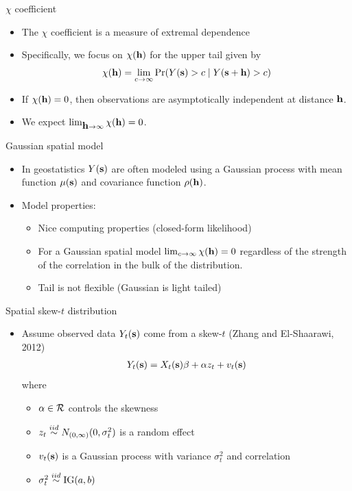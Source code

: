 \documentclass{beamer}
\begin{document}
\begin{frame}{$\chi$ coefficient}
  \begin{itemize} \setlength{\itemsep}{0.5em}
   \item The $\chi$ coefficient is a measure of extremal dependence
   \item Specifically, we focus on $\chi(\mbox{\bf h})$ for the upper tail given by
    \begin{align*}
      \chi(\mbox{\bf h}) = \lim_{c \rightarrow \infty}\Pr(Y(\mbox{\bf s}) > c \mid Y(\mbox{\bf s} + \mbox{\bf h}) > c)
    \end{align*}
    \item If $ \chi(\mbox{\bf h}) = 0$, then observations are asymptotically independent at distance $\mbox{\bf h}$.
    \item We expect $\lim_{\mbox{\bf h} \rightarrow \infty}\chi(\mbox{\bf h})=0$.
  \end{itemize}
\end{frame}

\begin{frame}{Gaussian spatial model}
  \begin{itemize} \setlength{\itemsep}{0.5em}
    \item In geostatistics $Y(\mbox{\bf s})$ are often modeled using a Gaussian process with mean function $\mu(\mbox{\bf s})$ and covariance function
$\rho(\mbox{\bf h})$.
    \item Model properties:
    \begin{itemize}
      \item Nice computing properties (closed-form likelihood)
    \item For a Gaussian spatial model $\lim_{c \rightarrow \infty} \chi(\mbox{\bf h}) = 0$ regardless of the strength of the correlation in the bulk of the distribution.
    \item Tail is not flexible (Gaussian is light tailed)
    \end{itemize}
    \end{itemize}
\end{frame}

\begin{frame}{Spatial skew-$t$ distribution}
  \begin{itemize} \setlength{\itemsep}{0.5em}
    \item Assume observed data $Y_t(\mbox{\bf s})$ come from a skew-$t$ (Zhang and El-Shaarawi, 2012)
    \begin{align*}
      Y_t(\mbox{\bf s}) = X_t(\mbox{\bf s})\beta + \alpha z_t + v_t(\mbox{\bf s})
    \end{align*}
    where
    \begin{itemize} \setlength{\itemsep}{0.25em}
      \item $\alpha \in {\cal R}$ controls the skewness
      \item $z_t \stackrel{iid}{\sim} N_{(0, \infty)}(0, \sigma^2_t)$ is a random effect
      \item $v_t(\mbox{\bf s})$ is a Gaussian process with variance $\sigma^2_t$ and \Matern correlation
      \item $\sigma_t^2 \stackrel{iid}{\sim} \text{IG}(a, b)$
    \end{itemize}
  \end{itemize}
\end{frame}
\end{document}
